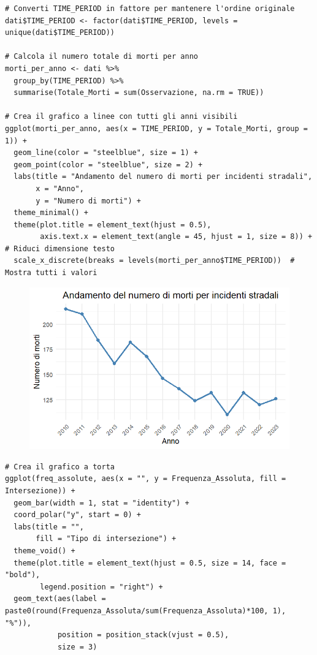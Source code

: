 \documentclass[14pt, openany, titlepage]{report} %
\begin{document}
\begin{center}
\begin{lstlisting}[breaklines=true]
# Converti TIME_PERIOD in fattore per mantenere l'ordine originale
dati$TIME_PERIOD <- factor(dati$TIME_PERIOD, levels = unique(dati$TIME_PERIOD))

# Calcola il numero totale di morti per anno
morti_per_anno <- dati %>%
  group_by(TIME_PERIOD) %>%
  summarise(Totale_Morti = sum(Osservazione, na.rm = TRUE))

# Crea il grafico a linee con tutti gli anni visibili
ggplot(morti_per_anno, aes(x = TIME_PERIOD, y = Totale_Morti, group = 1)) +
  geom_line(color = "steelblue", size = 1) +
  geom_point(color = "steelblue", size = 2) +
  labs(title = "Andamento del numero di morti per incidenti stradali",
       x = "Anno",
       y = "Numero di morti") +
  theme_minimal() +
  theme(plot.title = element_text(hjust = 0.5),
        axis.text.x = element_text(angle = 45, hjust = 1, size = 8)) +  # Riduci dimensione testo
  scale_x_discrete(breaks = levels(morti_per_anno$TIME_PERIOD))  # Mostra tutti i valori
\end{lstlisting}  
\end{center}

\begin{figure}[H] %
    \centering
    \includegraphics[width=12cm, height=7cm]{Rplot01.png} %
\end{figure}

\begin{center}
\begin{lstlisting}[breaklines=true]
# Crea il grafico a torta
ggplot(freq_assolute, aes(x = "", y = Frequenza_Assoluta, fill = Intersezione)) +
  geom_bar(width = 1, stat = "identity") +
  coord_polar("y", start = 0) +
  labs(title = "",
       fill = "Tipo di intersezione") +
  theme_void() +
  theme(plot.title = element_text(hjust = 0.5, size = 14, face = "bold"),
        legend.position = "right") +
  geom_text(aes(label = paste0(round(Frequenza_Assoluta/sum(Frequenza_Assoluta)*100, 1), "%")), 
            position = position_stack(vjust = 0.5),
            size = 3)
\end{lstlisting}  
\end{center}
\end{document}
